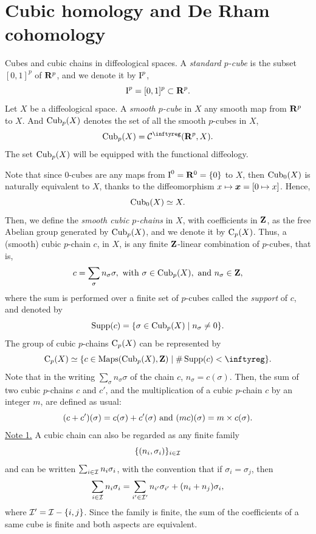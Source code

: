 \section{Cubic homology and De Rham cohomology}

\begin{Article}{Cubes and cubic chains in diffeological spaces.}{}
  \label{Cubes-and-cubic-chains-on-diffeological-spaces}
  A \emph{standard $p$-cube} is the subset $[0,1]^p$ of $\mathbf{R}^p$,
  and we denote it by $\operatorname{I}^{p}$,
  $$%
    \cub{p} = [0,1]^p \subset \RR^p.
  $$%
  Let $X$ be a diffeological space.
  A \emph{smooth $p$-cube} in $X$ any smooth map from $\mathbf{R}^p$ to $X$.
  And $\operatorname{Cub}_{p}(X)$ denotes the set of all the smooth $p$-cubes in $X$,
  $$%
    \DCubes{p}(X) = \Cinfty(\RR^p,X).
  $$%
  The set $\operatorname{Cub}_{p}(X)$ will be equipped with the functional diffeology.

  Note that since $0$-cubes are any maps from $\operatorname{I}^{0} = \mathbf{R}^0 = \{0\}$ to $X$,
  then $\operatorname{Cub}_{0}(X)$ is naturally equivalent to $X$,
  thanks to the diffeomorphism $x \mapsto {\boldsymbol x} = [0 \mapsto x]$.
  Hence,
  $$%
    \DCubes{0}(X) \simeq X.
  $$%
  Then,
  we define the \emph{smooth cubic $p$-chains} in $X$,
  with coefficients in $\mathbf{Z}$,
  as the free Abelian group generated by $\operatorname{Cub}_{p}(X)$,
  and we denote it by $\operatorname{C}_{p}(X)$.
  Thus,
  a (smooth) cubic $p$-chain $c$,
  in $X$,
  is any finite $\mathbf{Z}$-linear combination of $p$-cubes,
  that is,
  $$%
    c = \sum_\sigma n_\sigma \sigma,
    \text{ with } \sigma \in \DCubes{p}(X),
    \text{ and } n_\sigma \in \ZZ,
  $$%
  where the sum is performed over a finite set of $p$-cubes called the \emph{support} of $c$,
  and denoted by
  $$%
    \Supp(c) = \{ \sigma \in \DCubes{p}(X) \mid n_\sigma \neq 0 \}.
  $$%
  The group of cubic $p$-chains $\operatorname{C}_{p}(X)$ can be represented by
  $$%
    \DChains{p}(X) \simeq \{ c \in  \Maps(\DCubes{p}(X),\ZZ) \mid \#\Supp(c) <\infty \}.
  $$%
  Note that in the writing $\sum_\sigma n_\sigma \sigma$ of the chain $c$,
  $n_\sigma = c(\sigma)$.
  Then,
  the sum of two cubic $p$-chains $c$ and $c'$,
  and the multiplication of a cubic $p$-chain $c$ by an integer $m$,
  are defined as usual:
  $$%
    (c + c')(\sigma) = c(\sigma)  + c'(\sigma)
    \SpacedText{and} (mc)(\sigma) = m \times c(\sigma).
  $$%
  \uline{Note 1.} A cubic chain can also be regarded as any finite family
  $$%
    \{(n_i,\sigma_i)\}_{i \in \cI}
  $$%
  and can be written $\sum_{i \in \mathcal{I}} n_i \sigma_i$,
  with the convention that if $\sigma_i = \sigma_j$,
  then
  $$%
    \sum_{i \in \cI} n_i \sigma_i = \sum_{i' \in \cI'} n_{i'} \sigma_{i'} + (n_i + n_j)\sigma_i,
  $$%
  where $\mathcal{I}' = \mathcal{I} - \{i,j\}$.
  Since the family is finite,
  the sum of the coefficients of a same cube is finite and both aspects are equivalent.


\end{Article}
